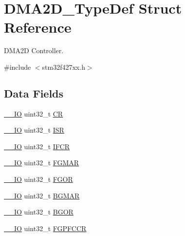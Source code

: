 \hypertarget{struct_d_m_a2_d___type_def}{}\section{D\+M\+A2\+D\+\_\+\+Type\+Def Struct Reference}
\label{struct_d_m_a2_d___type_def}


D\+M\+A2D Controller.  




{\ttfamily \#include $<$stm32f427xx.\+h$>$}

\subsection*{Data Fields}
\begin{DoxyCompactItemize}
\item 
\hyperlink{core__sc300_8h_aec43007d9998a0a0e01faede4133d6be}{\+\_\+\+\_\+\+IO} uint32\+\_\+t \hyperlink{struct_d_m_a2_d___type_def_ab40c89c59391aaa9d9a8ec011dd0907a}{CR}
\item 
\hyperlink{core__sc300_8h_aec43007d9998a0a0e01faede4133d6be}{\+\_\+\+\_\+\+IO} uint32\+\_\+t \hyperlink{struct_d_m_a2_d___type_def_ab3c49a96815fcbee63d95e1e74f20e75}{I\+SR}
\item 
\hyperlink{core__sc300_8h_aec43007d9998a0a0e01faede4133d6be}{\+\_\+\+\_\+\+IO} uint32\+\_\+t \hyperlink{struct_d_m_a2_d___type_def_ac6f9d540fd6a21c0fbc7bfbbee9a8504}{I\+F\+CR}
\item 
\hyperlink{core__sc300_8h_aec43007d9998a0a0e01faede4133d6be}{\+\_\+\+\_\+\+IO} uint32\+\_\+t \hyperlink{struct_d_m_a2_d___type_def_a17e8aa3d2c6464eba518c8ccf28c173d}{F\+G\+M\+AR}
\item 
\hyperlink{core__sc300_8h_aec43007d9998a0a0e01faede4133d6be}{\+\_\+\+\_\+\+IO} uint32\+\_\+t \hyperlink{struct_d_m_a2_d___type_def_af3d84e911bbb2bf8cfa6d5e1dfe01afe}{F\+G\+OR}
\item 
\hyperlink{core__sc300_8h_aec43007d9998a0a0e01faede4133d6be}{\+\_\+\+\_\+\+IO} uint32\+\_\+t \hyperlink{struct_d_m_a2_d___type_def_a2ab8fa08f05f63b322b38013283e6fa0}{B\+G\+M\+AR}
\item 
\hyperlink{core__sc300_8h_aec43007d9998a0a0e01faede4133d6be}{\+\_\+\+\_\+\+IO} uint32\+\_\+t \hyperlink{struct_d_m_a2_d___type_def_a29e2e00c79be42d49f6f189c207cc664}{B\+G\+OR}
\item 
\hyperlink{core__sc300_8h_aec43007d9998a0a0e01faede4133d6be}{\+\_\+\+\_\+\+IO} uint32\+\_\+t \hyperlink{struct_d_m_a2_d___type_def_add402fd3aa4845802f08f8df79a5a72a}{F\+G\+P\+F\+C\+CR}

\end{DoxyCompactItemize}
